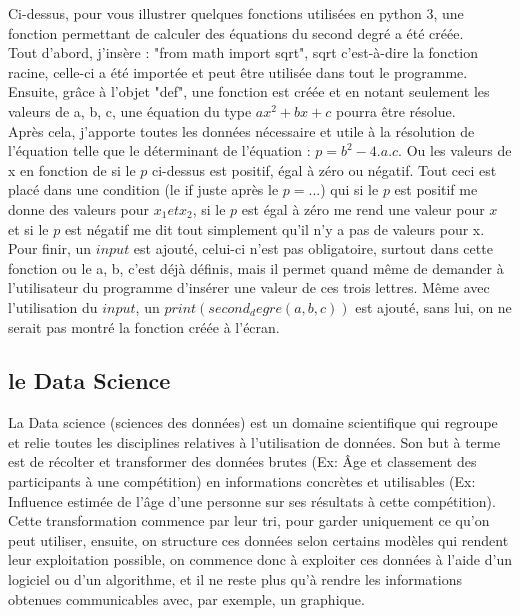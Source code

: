\documentclass[a4paper, 12pt]{article}
\numberwithin{equation}{subsection}
\begin{document}
Ci-dessus, pour vous illustrer quelques fonctions utilisées en python 3, une fonction permettant de calculer des équations du second degré a été créée.\\

Tout d'abord, j'insère : "from math import sqrt", sqrt c'est-à-dire la fonction racine, celle-ci a été importée et peut être utilisée dans tout le programme. Ensuite, grâce à l'objet "def", une fonction est créée et en notant seulement les valeurs de a, b, c, une équation du type $ax^2+bx+c$ pourra être résolue. \\

Après cela, j'apporte toutes les données nécessaire et utile à la résolution de l'équation telle que le déterminant de l'équation : $p=b^2-4.a.c$. Ou les valeurs de x en fonction de si le $p$ ci-dessus est positif, égal à zéro ou négatif. Tout ceci est placé dans une condition (le if juste après le $p=$...) qui si le $p$ est positif me donne des valeurs pour $x_1 et x_2$, si le $p$ est égal à zéro me rend une valeur pour $x$ et si le $p$ est négatif me dit tout simplement qu'il n'y a pas de valeurs pour x. \\

Pour finir, un $input$ est ajouté, celui-ci n'est pas obligatoire, surtout dans cette fonction ou le a, b, c'est déjà définis, mais il permet quand même de demander à l'utilisateur du programme d'insérer une valeur de ces trois lettres. Même avec l'utilisation du $input$, un $print(second_degre(a, b, c))$ est ajouté, sans lui, on ne serait pas montré la fonction créée à l'écran. \\

\subsection{le Data Science}
La Data science (sciences des données) est un domaine scientifique qui regroupe et relie toutes les disciplines relatives à l'utilisation de données. Son but à terme est de récolter et transformer des données brutes (Ex: Âge et classement des participants à une compétition) en informations concrètes et utilisables (Ex: Influence estimée de l'âge d'une personne sur ses résultats à cette compétition). Cette transformation commence par leur tri, pour garder uniquement ce qu'on peut utiliser, ensuite, on structure ces données selon certains modèles qui rendent leur exploitation possible, on commence donc à exploiter ces données à l'aide d'un logiciel ou d'un algorithme, et il ne reste plus qu'à rendre les informations obtenues communicables avec, par exemple, un graphique.\\
\end{document}
